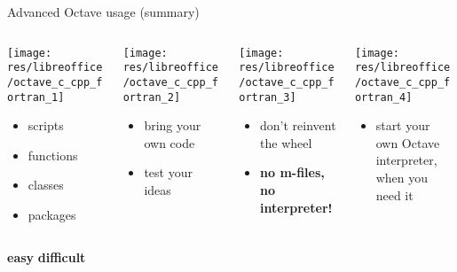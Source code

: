 \begin{frame}{Advanced Octave usage (summary)}
\begin{columns}[t]
\begin{column}{0.15\textwidth}
\texttt{[image: res/libreoffice/octave\_c\_cpp\_fortran\_1]}

\begin{itemize}
\item scripts
\item functions
\item classes
\item packages
\end{itemize}
\end{column}
\begin{column}{0.15\textwidth}
\texttt{[image: res/libreoffice/octave\_c\_cpp\_fortran\_2]}
\begin{itemize}
\small
\item bring your own code
\item test your ideas
\end{itemize}
\end{column}
\begin{column}{0.3\textwidth}
\texttt{[image: res/libreoffice/octave\_c\_cpp\_fortran\_3]}
\begin{itemize}
\small
\item don't reinvent the wheel
\item \textbf{no m-files,\\ no interpreter!}
\end{itemize}
\end{column}
\begin{column}{0.3\textwidth}
\texttt{[image: res/libreoffice/octave\_c\_cpp\_fortran\_4]}
\begin{itemize}
\small
\item start your own Octave interpreter, when you need it
\end{itemize}
\end{column}
\end{columns}
\vfill
\colorbox{green!10}{\textbf{easy} \greencheck}
\hfill \colorbox{red!10}{\textbf{difficult}}
\end{frame}